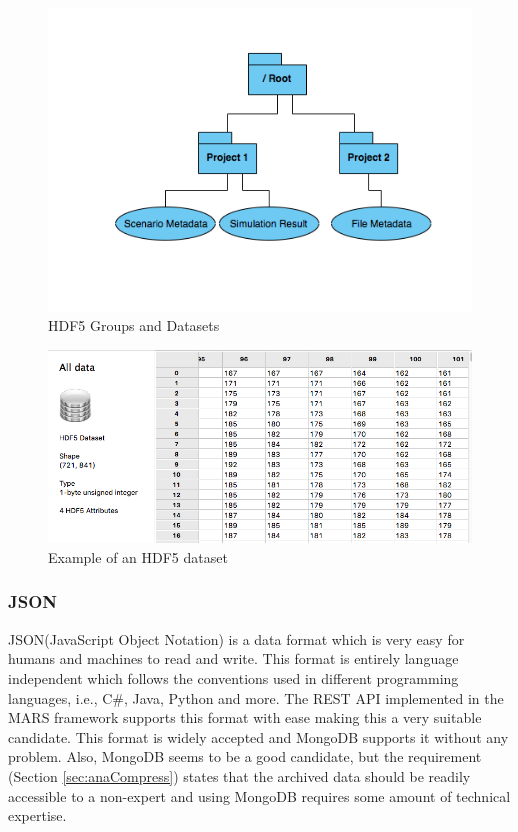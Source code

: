\begin{figure}[H]
    \centering \includegraphics[scale=0.6]{grafiken/groupsHDF5.png}
    \caption{HDF5 Groups and Datasets \cite{HDF5}}
    \label{fig:HDF5}
\end{figure}

\begin{figure}[H]
    \centering \includegraphics[scale=0.45]{grafiken/dataset.png}
    \caption{Example of an HDF5 dataset}
    \label{fig:dataset}
\end{figure}

\subsubsection{JSON} 
JSON(JavaScript Object Notation) is a data format which is very easy for humans and machines to read and write. This format is
entirely language independent which follows the conventions used in different programming languages, i.e., C\#, Java, Python and more. The REST API implemented in the
MARS framework supports this format with ease making this a very suitable candidate. This format is widely 
accepted and MongoDB supports it without any problem. Also, MongoDB seems to be a good candidate, but the requirement (Section \ref{sec:anaCompress}) states that the archived
data should be readily accessible to a non-expert and using MongoDB requires some amount of technical expertise.


